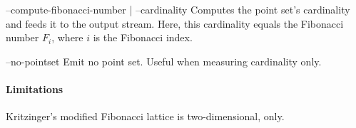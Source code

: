 \begin{procarg}{--compute-fibonacci-number | --cardinality}
  Computes the point set’s cardinality and feeds it to the output stream. Here, this cardinality equals the Fibonacci number $F_i$, where $i$ is the Fibonacci index.
\end{procarg}

\begin{procarg}{--no-pointset}
  Emit no point set. Useful when measuring cardinality only.
\end{procarg}

\procargout

\procargdelimiter

\procargsilent

\paragraph{Limitations}
Kritzinger's modified Fibonacci lattice is two-dimensional, only.
